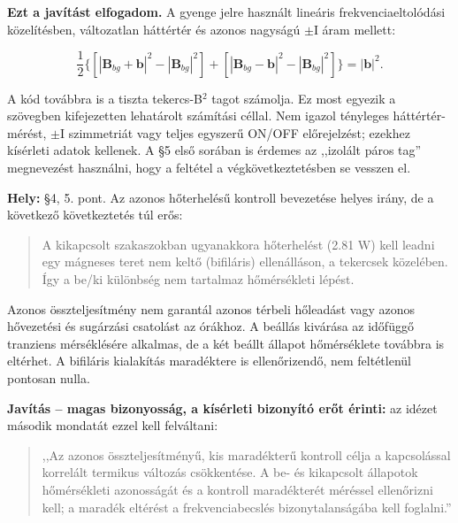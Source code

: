 \documentclass[10pt,a4paper]{article}
\begin{document}
{\begin{quote}
\end{quote}
\par
\textbf{Ezt a javítást elfogadom.} A gyenge jelre használt lineáris frekvenciaeltolódási közelítésben, változatlan háttértér és azonos nagyságú $\pm$I áram mellett:
\par
\[\frac{1}{2}\{[|\mathbf B_{bg}+\mathbf b|^2-|\mathbf B_{bg}|^2] +[|\mathbf B_{bg}-\mathbf b|^2-|\mathbf B_{bg}|^2]\}=|\mathbf b|^2.\]
\par
A kód továbbra is a tiszta tekercs-B$^2$ tagot számolja. Ez most egyezik a szövegben kifejezetten lehatárolt számítási céllal. Nem igazol tényleges háttértér-mérést, $\pm$I szimmetriát vagy teljes egyszerű ON/OFF előrejelzést; ezekhez kísérleti adatok kellenek. A \S5 első sorában is érdemes az ,,izolált páros tag'' megnevezést használni, hogy a feltétel a végkövetkeztetésben se vesszen el.
\par
\vspace{2pt}\par\vspace{0.5pt}
\par
\textbf{Hely:} \S4, 5. pont. Az azonos hőterhelésű kontroll bevezetése helyes irány, de a következő következtetés túl erős:
\par
\begin{quote}\vspace{-3pt}
A kikapcsolt szakaszokban ugyanakkora hőterhelést (2.81 W) kell leadni egy mágneses teret nem keltő (bifiláris) ellenálláson, a tekercsek közelében. Így a be/ki különbség nem tartalmaz hőmérsékleti lépést.

\end{quote}
\par
Azonos összteljesítmény nem garantál azonos térbeli hőleadást vagy azonos hővezetési és sugárzási csatolást az órákhoz. A beállás kivárása az időfüggő tranziens mérséklésére alkalmas, de a két beállt állapot hőmérséklete továbbra is eltérhet. A bifiláris kialakítás maradéktere is ellenőrizendő, nem feltétlenül pontosan nulla.
\par
\textbf{Javítás -- magas bizonyosság, a kísérleti bizonyító erőt érinti:} az idézet második mondatát ezzel kell felváltani:
\par
\begin{quote}\vspace{-3pt}
,,Az azonos összteljesítményű, kis maradékterű kontroll célja a kapcsolással korrelált termikus változás csökkentése. A be- és kikapcsolt állapotok hőmérsékleti azonosságát és a kontroll maradékterét méréssel ellenőrizni kell; a maradék eltérést a frekvenciabecslés bizonytalanságába kell foglalni.''


\end{quote}}
\end{document}
